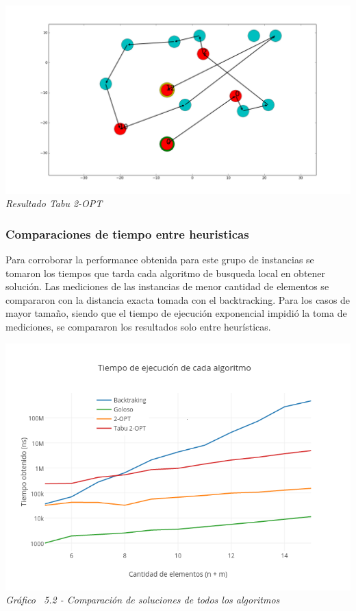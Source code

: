     \vspace*{0.3cm} \vspace*{0.3cm}
  \begin{center}
\includegraphics[scale=0.3]{./EJ5/caminoTabu.png}
\\{\textit{Resultado Tabu 2-OPT}}
  \end{center}
  \vspace*{0.3cm}


\subsubsection{Comparaciones de tiempo entre heuristicas}

Para corroborar la performance obtenida para este grupo de instancias se tomaron los tiempos que tarda cada algoritmo de busqueda local en obtener soluci\'on. 
 Las mediciones de las instancias de menor cantidad de elementos se compararon con la distancia exacta tomada con el backtracking. Para los casos de mayor tamaño, siendo que el tiempo de ejecución exponencial impidió la toma de mediciones, se compararon los resultados solo entre heurísticas.


\vspace*{0.3cm} \vspace*{0.3cm}
  \begin{center}
 \includegraphics[scale=0.5]{./EJ5/medicionTodos.png}\\
 {\textit{Gráfico \ 5.2 - Comparaci\'on de soluciones de todos los algoritmos}}
  \end{center}
  \vspace*{0.3cm}

